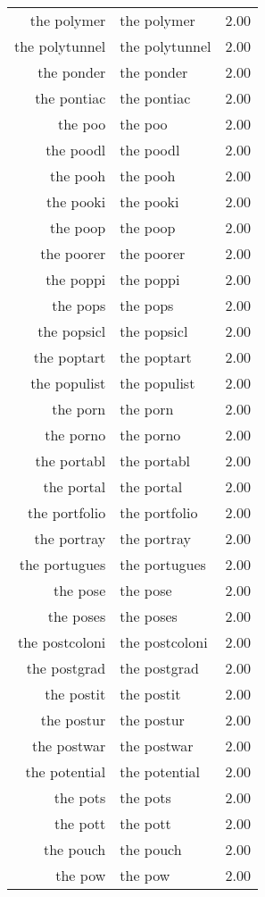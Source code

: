 \begin{table}[ht]
\begin{tabular}{rlr}
  the polymer & the polymer & 2.00 \\ 
  the polytunnel & the polytunnel & 2.00 \\ 
  the ponder & the ponder & 2.00 \\ 
  the pontiac & the pontiac & 2.00 \\ 
  the poo & the poo & 2.00 \\ 
  the poodl & the poodl & 2.00 \\ 
  the pooh & the pooh & 2.00 \\ 
  the pooki & the pooki & 2.00 \\ 
  the poop & the poop & 2.00 \\ 
  the poorer & the poorer & 2.00 \\ 
  the poppi & the poppi & 2.00 \\ 
  the pops & the pops & 2.00 \\ 
  the popsicl & the popsicl & 2.00 \\ 
  the poptart & the poptart & 2.00 \\ 
  the populist & the populist & 2.00 \\ 
  the porn & the porn & 2.00 \\ 
  the porno & the porno & 2.00 \\ 
  the portabl & the portabl & 2.00 \\ 
  the portal & the portal & 2.00 \\ 
  the portfolio & the portfolio & 2.00 \\ 
  the portray & the portray & 2.00 \\ 
  the portugues & the portugues & 2.00 \\ 
  the pose & the pose & 2.00 \\ 
  the poses & the poses & 2.00 \\ 
  the postcoloni & the postcoloni & 2.00 \\ 
  the postgrad & the postgrad & 2.00 \\ 
  the postit & the postit & 2.00 \\ 
  the postur & the postur & 2.00 \\ 
  the postwar & the postwar & 2.00 \\ 
  the potential & the potential & 2.00 \\ 
  the pots & the pots & 2.00 \\ 
  the pott & the pott & 2.00 \\ 
  the pouch & the pouch & 2.00 \\ 
  the pow & the pow & 2.00 \\ 

\end{tabular}
\end{table}
